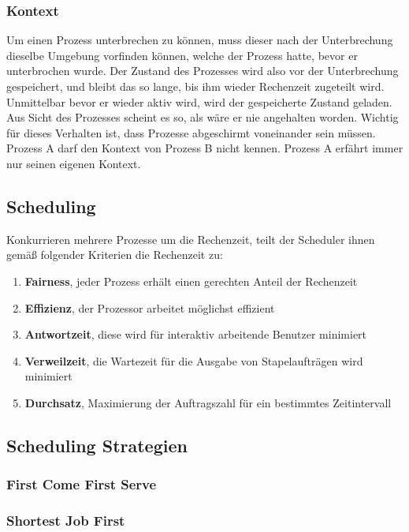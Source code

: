 \documentclass[12pt,a4paper]{article}
\begin{document}
\subsubsection{Kontext}
Um einen Prozess unterbrechen zu können, muss dieser nach der Unterbrechung dieselbe Umgebung vorfinden können, welche der Prozess hatte, bevor er unterbrochen wurde. Der Zustand des Prozesses wird also vor der Unterbrechung gespeichert, und bleibt das so lange, bis ihm wieder Rechenzeit zugeteilt wird. Unmittelbar bevor er wieder aktiv wird, wird der gespeicherte Zustand geladen. Aus Sicht des Prozesses scheint es so, als wäre er nie angehalten worden.\newline
Wichtig für dieses Verhalten ist, dass Prozesse abgeschirmt voneinander sein müssen. Prozess A darf den Kontext von Prozess B nicht kennen. Prozess A erfährt immer nur seinen eigenen Kontext.

\subsection{Scheduling}
Konkurrieren mehrere Prozesse um die Rechenzeit, teilt der Scheduler ihnen gemäß folgender Kriterien die Rechenzeit zu:
\begin{enumerate}
	\item \textbf{Fairness}, jeder Prozess erhält einen gerechten Anteil der Rechenzeit
	\item \textbf{Effizienz}, der Prozessor arbeitet möglichst effizient
	\item \textbf{Antwortzeit}, diese wird für interaktiv arbeitende Benutzer minimiert
	\item \textbf{Verweilzeit}, die Wartezeit für die Ausgabe von Stapelaufträgen wird minimiert
	\item \textbf{Durchsatz}, Maximierung der Auftragszahl für ein bestimmtes Zeitintervall
\end{enumerate}

\subsection{Scheduling Strategien}

\subsubsection{First Come First Serve}

\subsubsection{Shortest Job First}
\end{document}

